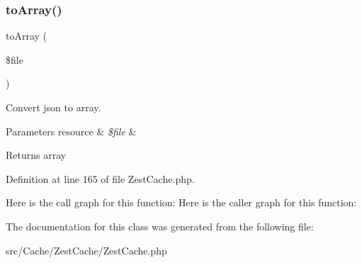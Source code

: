 \subsubsection{\texorpdfstring{to\+Array()}{toArray()}}
{\footnotesize\ttfamily to\+Array (\begin{DoxyParamCaption}\item[{}]{\$file }\end{DoxyParamCaption})}

Convert json to array.


\begin{DoxyParams}[1]{Parameters}
resource & {\em \$file} & \\
\hline
\end{DoxyParams}
\begin{DoxyReturn}{Returns}
array 
\end{DoxyReturn}


Definition at line 165 of file Zest\+Cache.\+php.

Here is the call graph for this function\+:
Here is the caller graph for this function\+:


The documentation for this class was generated from the following file\+:\begin{DoxyCompactItemize}
\item 
src/\+Cache/\+Zest\+Cache/Zest\+Cache.\+php\end{DoxyCompactItemize}
